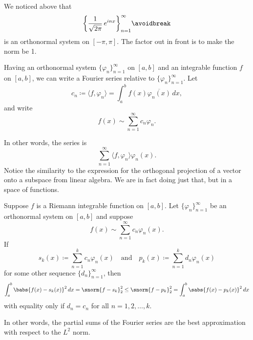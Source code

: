We noticed above that
\begin{equation*}
{\left\{ \frac{1}{\sqrt{2\pi}} \, e^{inx} \right\}}_{n=1}^\infty
\avoidbreak
\end{equation*}
is an orthonormal system on $[-\pi,\pi]$.
The factor out in front is to make the norm be 1.

Having an orthonormal system $\{ \varphi_n \}_{n=1}^\infty$ on $[a,b]$ and an integrable function $f$
on $[a,b]$, we can write
a Fourier series relative to $\{ \varphi_n \}_{n=1}^\infty$.  Let
\begin{equation*}
c_n \coloneqq
\langle f , \varphi_n \rangle
=
\int_a^b f(x) \overline{\varphi_n(x)} \, dx ,
\end{equation*}
and write
\begin{equation*}
f(x) \sim \sum_{n=1}^\infty c_n \varphi_n .
\end{equation*}

In other words, the series is
\begin{equation*}
\sum_{n=1}^\infty \langle f , \varphi_n \rangle \varphi_n(x) .
\end{equation*}
Notice the similarity to the expression for the orthogonal
projection of a vector onto a subspace from linear algebra.  We are
in fact doing just that, but in a space of functions.

\begin{thm} \label{thm:l2bestapprox}
Suppose $f$ is a Riemann integrable function on $[a,b]$.
Let $\{ \varphi_n \}_{n=1}^\infty$ be an orthonormal system on $[a,b]$ and
suppose
\begin{equation*}
f(x) \sim \sum_{n=1}^\infty c_n \varphi_n(x) .
\end{equation*}
If
\begin{equation*}
s_k (x) \coloneqq \sum_{n=1}^k c_n \varphi_n(x)
\quad\text{and}\quad
p_k (x) \coloneqq \sum_{n=1}^k d_n \varphi_n(x)
\end{equation*}
for some other sequence $\{ d_n \}_{n=1}^\infty$, then
\begin{equation*}
\int_a^b \babs{f(x)-s_k(x)}^2 \, dx = \snorm{f-s_k}_2^2 \leq
\snorm{f-p_k}_2^2 = \int_a^b \sabs{f(x)-p_k(x)}^2 \, dx
\end{equation*}
with equality only if $d_n = c_n$ for all $n=1,2,\ldots,k$.
\end{thm}

In other words, the partial sums of the Fourier series are the best approximation with respect to the
$L^2$ norm.

